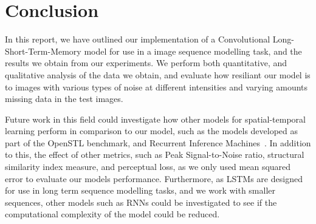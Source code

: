 \documentclass[twocolumn]{article}
\begin{document}
\section{Conclusion}

In this report, we have outlined our implementation of a Convolutional Long-Short-Term-Memory model for use in a image sequence modelling task, and the results we obtain from our experiments. We perform both quantitative, and qualitative analysis of the data we obtain, and evaluate how resiliant our model is to images with various types of noise at different intensities and varying amounts missing data in the test images. 

Future work in this field could investigate how other models for spatial-temporal learning perform in comparison to our model, such as the models developed as part of the OpenSTL benchmark\cite{tan2023openstl,gao2022simvp,tan2022simvpv2,tan2023temporal}, and Recurrent Inference Machines~\cite{putzky2017recurrentinferencemachinessolving}. In addition to this, the effect of other metrics, such as Peak Signal-to-Noise ratio, structural similarity index measure, and perceptual loss, as we only used mean squared error to evaluate our models performance. Furthermore, as LSTMs are designed for use in long term sequence modelling tasks, and we work with smaller sequences, other models such as RNNs could be investigated to see if the computational complexity of the model could be reduced.

\printbibliography
\end{document}
